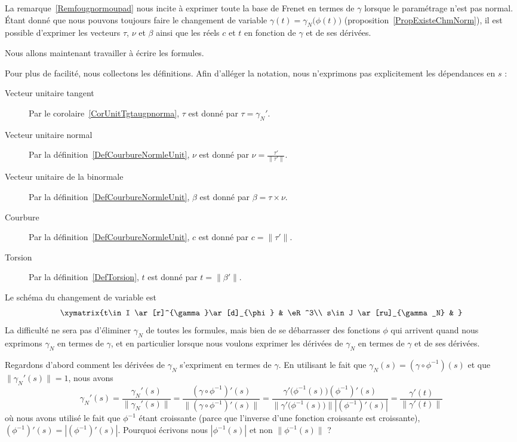 La remarque~\ref{Remfougnormoupad} nous incite à exprimer toute la base de Frenet en termes de \( \gamma\) lorsque le paramétrage n'est pas normal. Étant donné que nous pouvons toujours faire le changement de variable \( \gamma(t)=\gamma_N\big( \phi(t) \big)\) (proposition~\ref{PropExisteChmNorm}), il est possible d'exprimer les vecteurs \( \tau\), \( \nu\) et \( \beta\) ainsi que les réels \( c\) et \( t\) en fonction de \( \gamma\) et de ses dérivées.

Nous allons maintenant travailler à écrire les formules.

Pour plus de facilité, nous collectons les définitions. Afin d'alléger la notation, nous n'exprimons pas explicitement les dépendances en \( s\) :
\begin{description}
	\item[Vecteur unitaire tangent]
		Par le corolaire~\ref{CorUnitTgtaugpnorma}, \( \tau\) est donné par \( \tau=\gamma_N'\).
	\item[Vecteur unitaire normal]
		Par la définition~\ref{DefCourbureNormleUnit}, \( \nu\) est donné par
		\( \nu=\frac{ \tau' }{ \| \tau' \| }\).
	\item[Vecteur unitaire de la binormale]
		Par la définition~\ref{DefCourbureNormleUnit}, \( \beta\) est donné par
		\( \beta=\tau\times\nu\).
	\item[Courbure]
		Par la définition~\ref{DefCourbureNormleUnit}, \( c\) est donné par
		\( c=\| \tau' \|\).
	\item[Torsion]
		Par la définition~\ref{DefTorsion}, \( t\) est donné par
		\( t=\| \beta' \|\).
\end{description}


Le schéma du changement de variable est
\begin{equation}        \label{EqDiagIJstgvpR}
	\xymatrix{%
		t\in I \ar[r]^{\gamma}\ar[d]_{\phi}      &   \eR^3\\
		s\in J \ar[ru]_{\gamma_N}  &
	}
\end{equation}
La difficulté ne sera pas d'éliminer \( \gamma_N\) de toutes les formules, mais bien de se débarrasser des fonctions \( \phi\) qui arrivent quand nous exprimons \( \gamma_N\) en termes de \( \gamma\), et en particulier lorsque nous voulons exprimer les dérivées de \( \gamma_N\) en termes de \( \gamma\) et de ses dérivées.

Regardons d'abord comment les dérivées de \( \gamma_N\) s'expriment en termes de \( \gamma\). En utilisant le fait que \( \gamma_N(s)=(\gamma\circ\phi^{-1})(s)\) et que \( \| \gamma_N'(s) \|=1\), nous avons
\begin{equation}        \label{EqgpNgpnNnr}
	\gamma_N'(s)=\frac{ \gamma_N'(s) }{ \| \gamma_N'(s) \| }
	=\frac{ (\gamma\circ\phi^{-1})'(s) }{ \| (\gamma\circ\phi^{-1})'(s) \| }
	=\frac{ \gamma'\big( \phi^{-1}(s) \big)   (\phi^{-1})'(s)   }{ \| \gamma'\big( \phi^{-1}(s) \big) \|  |(\phi^{-1})'(s) |}
	=\frac{ \gamma'(t) }{ \| \gamma'(t) \| }
\end{equation}
où nous avons utilisé le fait que \( \phi^{-1}\) étant croissante (parce que l'inverse d'une fonction croissante est croissante), \( (\phi^{-1})'(s)=| (\phi^{-1})'(s) |\). Pourquoi écrivons nous \( | \phi^{-1}(s) |\) et non \( \| \phi^{-1}(s) \|\) ?

